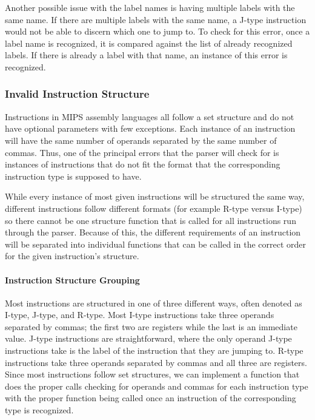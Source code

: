\documentclass[
    parskip=half,
    fontsize=12pt,
    titlepage=firstiscover,
    toc=bibliography,
    numbers=endperiod
]{scrartcl}
\begin{document}
Another possible issue with the label names is having multiple labels
with the same name. If there are multiple labels with the same name, a
J-type instruction would not be able to discern which one to jump to. To
check for this error, once a label name is recognized, it is compared
against the list of already recognized labels. If there is already a
label with that name, an instance of this error is recognized.

\subsubsection{Invalid Instruction Structure}

Instructions in MIPS assembly languages all follow a set structure and
do not have optional parameters with few exceptions. Each instance of an
instruction will have the same number of operands separated by the same
number of commas. Thus, one of the principal errors that the parser will
check for is instances of instructions that do not fit the format that
the corresponding instruction type is supposed to have.

While every instance of most given instructions will be structured the
same way, different instructions follow different formats (for example
R-type versus I-type) so there cannot be one structure function that is
called for all instructions run through the parser. Because of this, the
different requirements of an instruction will be separated into
individual functions that can be called in the correct order for the
given instruction's structure.

\paragraph{Instruction Structure Grouping}

Most instructions are structured in one of three different ways, often
denoted as I-type, J-type, and R-type. Most I-type instructions take
three operands separated by commas; the first two are registers while
the last is an immediate value. J-type instructions are straightforward,
where the only operand J-type instructions take is the label of the
instruction that they are jumping to. R-type instructions take three
operands separated by commas and all three are registers. Since most
instructions follow set structures, we can implement a function that
does the proper calls checking for operands and commas for each
instruction type with the proper function being called once an
instruction of the corresponding type is recognized.
\end{document}
